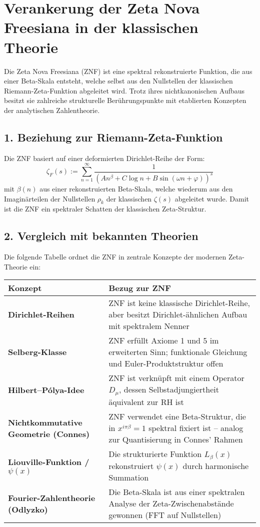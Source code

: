 \section{Verankerung der Zeta Nova Freesiana in der klassischen Theorie}

Die Zeta Nova Freesiana (ZNF) ist eine spektral rekonstruierte Funktion, die aus einer Beta-Skala entsteht, welche selbst aus den Nullstellen der klassischen Riemann-Zeta-Funktion abgeleitet wird. Trotz ihres nichtkanonischen Aufbaus besitzt sie zahlreiche strukturelle Berührungspunkte mit etablierten Konzepten der analytischen Zahlentheorie.

\subsection*{1. Beziehung zur Riemann-Zeta-Funktion}

Die ZNF basiert auf einer deformierten Dirichlet-Reihe der Form:
\[
\zeta_F(s) := \sum_{n=1}^\infty \frac{1}{(A n^\beta + C \log n + B \sin(\omega n + \varphi))^s}
\]
mit \(\beta(n)\) aus einer rekonstruierten Beta-Skala, welche wiederum aus den Imaginärteilen der Nullstellen \(\rho_k\) der klassischen \(\zeta(s)\) abgeleitet wurde. Damit ist die ZNF ein spektraler Schatten der klassischen Zeta-Struktur.

\subsection*{2. Vergleich mit bekannten Theorien}

Die folgende Tabelle ordnet die ZNF in zentrale Konzepte der modernen Zeta-Theorie ein:

\begin{center}
\begin{tabular}{|l|p{9cm}|}
\hline
\textbf{Konzept} & \textbf{Bezug zur ZNF} \\
\hline
\textbf{Dirichlet-Reihen} & ZNF ist keine klassische Dirichlet-Reihe, aber besitzt Dirichlet-ähnlichen Aufbau mit spektralem Nenner \\
\hline
\textbf{Selberg-Klasse} & ZNF erfüllt Axiome 1 und 5 im erweiterten Sinn; funktionale Gleichung und Euler-Produktstruktur offen \\
\hline
\textbf{Hilbert–Pólya-Idee} & ZNF ist verknüpft mit einem Operator \( D_\mu \), dessen Selbstadjungiertheit äquivalent zur RH ist \\
\hline
\textbf{Nichtkommutative Geometrie (Connes)} & ZNF verwendet eine Beta-Struktur, die in \( x^{i \pi \beta} = 1 \) spektral fixiert ist – analog zur Quantisierung in Connes' Rahmen \\
\hline
\textbf{Liouville-Funktion / \(\psi(x)\)} & Die strukturierte Funktion \( L_\beta(x) \) rekonstruiert \(\psi(x)\) durch harmonische Summation \\
\hline
\textbf{Fourier-Zahlentheorie (Odlyzko)} & Die Beta-Skala ist aus einer spektralen Analyse der Zeta-Zwischenabstände gewonnen (FFT auf Nullstellen) \\
\hline
\end{tabular}
\end{center}

